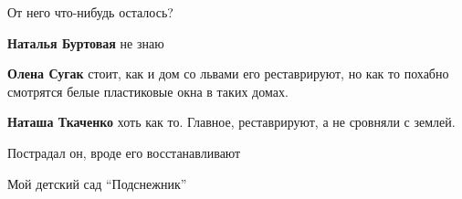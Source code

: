  
 
 
 
 

\qqSecCmt


От него что-нибудь осталось?

\begin{itemize} %
\textbf{Наталья Буртовая} не знаю

\textbf{Олена Сугак} стоит, как и дом со львами его реставрируют, но как то похабно смотрятся белые пластиковые окна в таких домах.

\textbf{Наташа Ткаченко} хоть как то. Главное, реставрируют, а не сровняли с землей.
\end{itemize} %


Пострадал он, вроде его восстанавливают


Мой детский сад \enquote{Подснежник}

